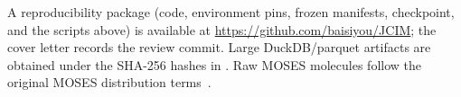 A reproducibility package (code, environment pins, frozen manifests, checkpoint, and the scripts above) is available at \url{https://github.com/baisiyou/JCIM}; the cover letter records the review commit. Large DuckDB/parquet artifacts are obtained under the SHA-256 hashes in . Raw MOSES molecules follow the original MOSES distribution terms~\citep{polykovskiy2020moses}.
